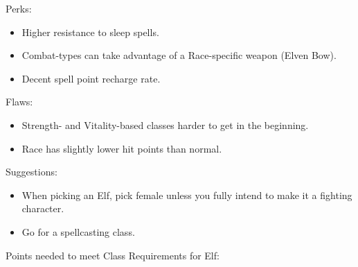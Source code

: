 \documentclass[12pt]{article}
\providecommand{\tightlist}{%
  \setlength{\itemsep}{0pt}\setlength{\parskip}{0pt}}
\newcommand{\WviiTwoColumnSetup}{\raggedcolumns\RaggedRight}
\begin{document}
\begin{multicols}{2}\WviiTwoColumnSetup
Perks:

\begin{itemize}
\tightlist
\item
  Higher resistance to sleep spells.
\item
  Combat-types can take advantage of a Race-specific weapon (Elven Bow).
\item
  Decent spell point recharge rate.
\end{itemize}
\columnbreak

Flaws:

\begin{itemize}
\tightlist
\item
  Strength- and Vitality-based classes harder to get in the beginning.
\item
  Race has slightly lower hit points than normal.
\end{itemize}
\end{multicols}

Suggestions:

\begin{itemize}
\item
  When picking an Elf, pick female unless you fully intend to make it a
  fighting character.
\item
  Go for a spellcasting class.
\end{itemize}

Points needed to meet Class Requirements for Elf:
\end{document}

